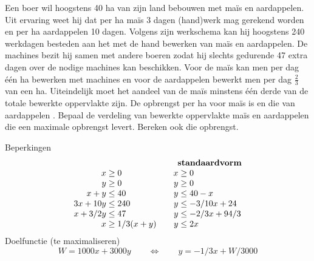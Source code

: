 \begin{oef}\label{oef:mais-rijst}
Een boer wil hoogstens 40 ha van zijn land bebouwen met
ma\"{i}s en aardappelen. Uit ervaring weet hij dat per ha ma\"is
$3$ dagen (hand)werk mag gerekend worden en per ha aardappelen 10 dagen.
Volgens zijn werkschema kan hij hoogstens 240 werkdagen besteden
aan het met de hand bewerken van ma\"is en aardappelen. De machines
bezit hij samen met andere boeren zodat hij slechts gedurende 47
extra dagen over de nodige machines kan beschikken. Voor de 
ma\"{i}s kan men per dag  \'e\'en ha bewerken met 
machines en voor 
de aardappelen bewerkt men per dag $\frac{2}{3}$ van een ha. 
Uiteindelijk  moet het aandeel van de ma\"{i}s minstens  \'e\'en
derde van de totale bewerkte oppervlakte zijn. De opbrengst
per ha voor ma\"is  is en die van aardappelen .
Bepaal de verdeling van bewerkte oppervlakte ma\"is en
aardappelen die een maximale opbrengst levert. Bereken ook die
opbrengst. 
\begin{opl}
Beperkingen
\[
  \begin{array}{r@{\;}c@{\;}l@{\qquad}r@{\;}c@{\;}l}
    &&& \multicolumn{3}{c}{\mathbf{standaardvorm}} \\
    x & \geq & 0 &            x & \geq & 0\\
    y & \geq & 0 &            y & \geq & 0 \\
    x + y & \leq & 40 &       y & \leq & 40 - x \\
    3x + 10y & \leq & 240 &   y & \leq & -3/10x+24\\
    x+3/2y & \leq & 47 &      y & \leq & -2/3x+94/3 \\
    x & \geq & 1/3(x+y) &     y & \leq & 2x \\
  \end{array}
\]
Doelfunctie (te maximaliseren)
\[
  W = 1000x+3000y \qquad \iff \qquad y = -1/3x + W/3000
\]
\begin{figure}[hbtp]
  \centering
\end{figure}
\end{opl}
\end{oef}
